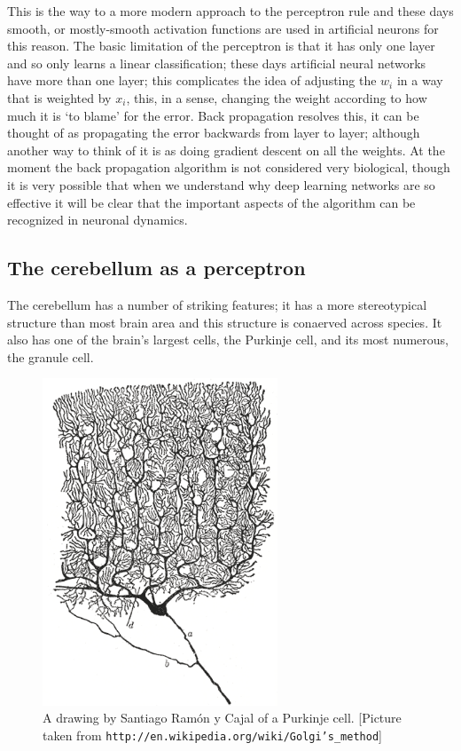 \documentclass[12pt]{article}
\begin{document}
This is the way to a more modern approach to the perceptron rule and
these days smooth, or mostly-smooth activation functions are used in
artificial neurons for this reason. The basic limitation of the
perceptron is that it has only one layer and so only learns a linear
classification; these days artificial neural networks have more than
one layer; this complicates the idea of adjusting the $w_i$ in a way
that is weighted by $x_i$, this, in a sense, changing the weight
according to how much it is \lq{}to blame\rq{} for the error. Back
propagation resolves this, it can be thought of as propagating the
error backwards from layer to layer; although another way to think of
it is as doing gradient descent on all the weights. At the moment the
back propagation algorithm is not considered very biological, though
it is very possible that when we understand why deep learning networks
are so effective it will be clear that the important aspects of the
algorithm can be recognized in neuronal dynamics.

\subsection*{The cerebellum as a perceptron}

The cerebellum has a number of striking features; it has a more
stereotypical structure than most brain area and this structure is
conaerved across species. It also has one of the brain's largest cells,
the Purkinje cell, and its most numerous, the granule cell.

\begin{figure}
\begin{center}
\includegraphics[width=7cm]{Purkinje_cell_by_Cajal.png}
\end{center}
\caption{A drawing by Santiago Ram\'{o}n y Cajal of a Purkinje cell. [Picture taken from \texttt{http://en.wikipedia.org/wiki/Golgi's\_method}]\label{fig:PC}}
\end{figure}
\end{document}
